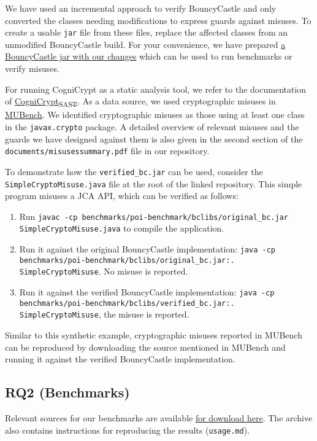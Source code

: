 \documentclass[parskip=full]{scrreprt}
\begin{document}
We have used an incremental approach to verify BouncyCastle and only converted the classes
needing modifications to express guards against misuses.
To create a usable \texttt{jar} file from these files, replace the affected classes from an
unmodified BouncyCastle build. For your convenience, we have prepared \href{https://zenodo.org/record/5767812/files/verified_bc.jar?download=1}{a BouncyCastle jar with our changes} which can be used to run benchmarks or verify misuses.

For running CogniCrypt as a static analysis tool, we refer to the documentation of \href{https://github.com/CROSSINGTUD/CryptoAnalysis}{CogniCrypt\textsubscript{SAST}}.
As a data source, we used cryptographic misuses in \href{https://github.com/stg-tud/MUBench}{MUBench}. We identified cryptographic misuses as those using at least one class in
the \texttt{javax.crypto} package.
A detailed overview of relevant misuses and the guards we have designed against them is also given in the second section of the \texttt{documents/misusessummary.pdf} file in our repository.

To demonstrate how the \texttt{verified\_bc.jar} can be used, consider the \texttt{SimpleCryptoMisuse.java} file at the root of the linked repository.
This simple program misuses a JCA API, which can be verified as follows:

\begin{enumerate}
 \item Run \texttt{javac -cp benchmarks/poi-benchmark/bclibs/original\_bc.jar  SimpleCryptoMisuse.java} to compile the application.
 \item Run it against the original BouncyCastle implementation: \texttt{java -cp benchmarks/poi-benchmark/bclibs/original\_bc.jar:. SimpleCryptoMisuse}. No misuse is reported.
 \item Run it against the verified BouncyCastle implementation: \texttt{java -cp benchmarks/poi-benchmark/bclibs/verified\_bc.jar:. SimpleCryptoMisuse}, the misuse is reported.
\end{enumerate}

Similar to this synthetic example, cryptographic misuses reported in MUBench can be reproduced by downloading the source mentioned in MUBench and running it against the verified BouncyCastle implementation.

\subsection{RQ2 (Benchmarks)}

Relevant sources for our benchmarks are available \href{https://we.tl/t-9rSNP1Io3f}{for download here}. The archive also contains instructions for reproducing the results
(\texttt{usage.md}).
\end{document}
